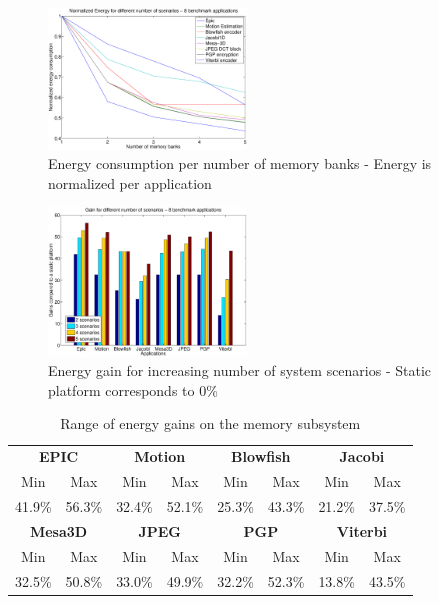 \documentclass[a4paper,conference]{IEEEtran}
\begin{document}
\begin{figure}[!t]
\centering
\includegraphics[width=0.47\textwidth]{Images/6apps.eps}
\caption{Energy consumption per number of memory banks - Energy is normalized per application}
\label{fig:energy}
\end{figure}

\begin{figure}[!t]
\centering
\includegraphics[width=0.47\textwidth]{Images/6appsGains.eps}
\caption{Energy gain for increasing number of system scenarios - Static platform corresponds to 0\%}
\label{fig:gains}
\end{figure}

\begin{center}
	\begin{table}[!t]
	\caption{Range of energy gains on the memory subsystem}
	\label{tab:ranges}
	{\small
	\hfill{}
	\begin{tabular}{|c|c|c|c|c|c|c|c|}
		\hline
		\multicolumn{2}{|c|}{\textbf{EPIC}} &
		\multicolumn{2}{c|}{\textbf{Motion}} &
		\multicolumn{2}{c|}{\textbf{Blowfish}} &
		\multicolumn{2}{c|}{\textbf{Jacobi}}
		\\ 
		\cline{1-8}
		Min & Max & Min & Max & Min & Max & 
		Min & Max \\ 
		\hline 
		41.9\% & 56.3\% & 32.4\% & 52.1\% & 25.3\% & 43.3\% & 
		21.2\% & 37.5\% \\ 
		\hline 

		\multicolumn{2}{|c|}{\textbf{Mesa3D}} &
		\multicolumn{2}{c|}{\textbf{JPEG}} &
		\multicolumn{2}{c|}{\textbf{PGP}} &
		\multicolumn{2}{c|}{\textbf{Viterbi}} \\ 
		\cline{1-8}
		Min & Max & Min & Max & Min & Max & 
		Min & Max \\ 
		\hline 
		32.5\% & 50.8\% & 33.0\% & 49.9\% & 
		32.2\% & 52.3\% & 13.8\% & 43.5\% \\ 
		\hline 
		
	\end{tabular}
	\hfill{}}
	\end{table}
\end{center}
\end{document}
